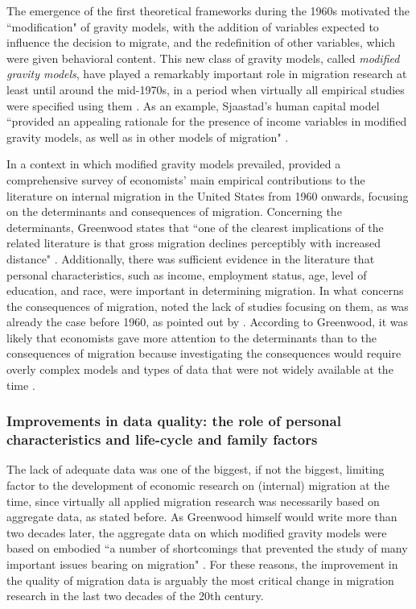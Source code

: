 The emergence of the first theoretical frameworks during the 1960s motivated the ``modification" of gravity models, with the addition of variables expected to influence the decision to migrate, and the redefinition of other variables, which were given behavioral content. This new class of gravity models, called \textit{modified gravity models}, have played a remarkably important role in migration research at least until around the mid-1970s, in a period when virtually all empirical studies were specified using them \citep{greenwood_research_1975, greenwood_internal_1997, greenwood_early_2003}. As an example, Sjaastad's human capital model ``provided an appealing rationale for the presence of income variables in modified gravity models, as well as in other models of migration" \citep[p. 670]{greenwood_internal_1997}. 

In a context in which modified gravity models prevailed, \cite{greenwood_research_1975} provided a comprehensive survey of economists' main empirical contributions to the literature on internal migration in the United States from 1960 onwards, focusing on the determinants and consequences of migration. Concerning the determinants, Greenwood states that ``one of the clearest implications of the related literature is that gross migration declines perceptibly with increased distance" \citep[p. 410]{greenwood_research_1975}. Additionally, there was sufficient evidence in the literature that personal characteristics, such as income, employment status, age, level of education, and race, were important in determining migration. In what concerns the consequences of migration, \cite{greenwood_research_1975} noted the lack of studies focusing on them, as was already the case before 1960, as pointed out by \cite{sjaastad_costs_1962}. According to Greenwood, it was likely that economists gave more attention to the determinants than to the consequences of migration because investigating the consequences would require overly complex models and types of data that were not widely available at the time \citep{greenwood_research_1975}.

\subsubsection{Improvements in data quality: the role of personal characteristics and life-cycle and family factors}

The lack of adequate data was one of the biggest, if not the biggest, limiting factor to the development of economic research on (internal) migration at the time, since virtually all applied migration research was necessarily based on aggregate data, as stated before. As Greenwood himself would write more than two decades later, the aggregate data on which modified gravity models were based on embodied ``a number of shortcomings that prevented the study of many important issues bearing on migration" \citep[p. 707]{greenwood_internal_1997}. For these reasons, the improvement in the quality of migration data is arguably the most critical change in migration research in the last two decades of the 20th century. 

